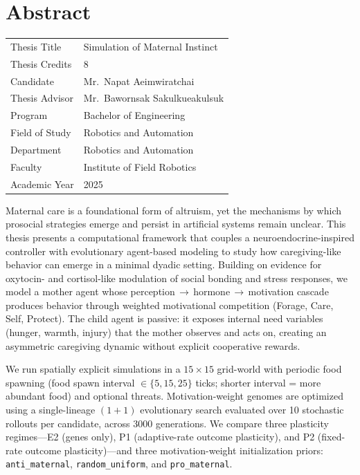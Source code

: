 \newpage
\chapter*{Abstract}

\begin{table}[h]
    \begin{tabular}{l l}
        Thesis Title   & Simulation of Maternal Instinct \\
        Thesis Credits & 8 \\
        Candidate      & Mr.\ Napat Aeimwiratchai \\
        Thesis Advisor & Mr.\ Bawornsak Sakulkueakulsuk \\
        Program        & Bachelor of Engineering \\
        Field of Study & Robotics and Automation \\
        Department     & Robotics and Automation \\
        Faculty        & Institute of Field Robotics \\
        Academic Year  & 2025 \\
    \end{tabular}
\end{table}

Maternal care is a foundational form of altruism, yet the mechanisms by which prosocial strategies emerge and persist in artificial systems remain unclear.
This thesis presents a computational framework that couples a neuroendocrine-inspired controller with evolutionary agent-based modeling to study how caregiving-like behavior can emerge in a minimal dyadic setting.
Building on evidence for oxytocin- and cortisol-like modulation of social bonding and stress responses, we model a mother agent whose perception\,\allowbreak$\to$\,hormone\,\allowbreak$\to$\,motivation cascade produces behavior through weighted motivational competition (Forage, Care, Self, Protect).
The child agent is passive: it exposes internal need variables (hunger, warmth, injury) that the mother observes and acts on, creating an asymmetric caregiving dynamic without explicit cooperative rewards.

We run spatially explicit simulations in a $15\times15$ grid-world with periodic food spawning (food spawn interval $\in\{5,15,25\}$ ticks; shorter interval = more abundant food) and optional threats.
Motivation-weight genomes are optimized using a single-lineage $(1{+}1)$ evolutionary search evaluated over 10 stochastic rollouts per candidate, across 3000 generations.
We compare three plasticity regimes---E2 (genes only), P1 (adaptive-rate outcome plasticity), and P2 (fixed-rate outcome plasticity)---and three motivation-weight initialization priors: \texttt{anti\_maternal}, \texttt{random\_uniform}, and \texttt{pro\_maternal}.

